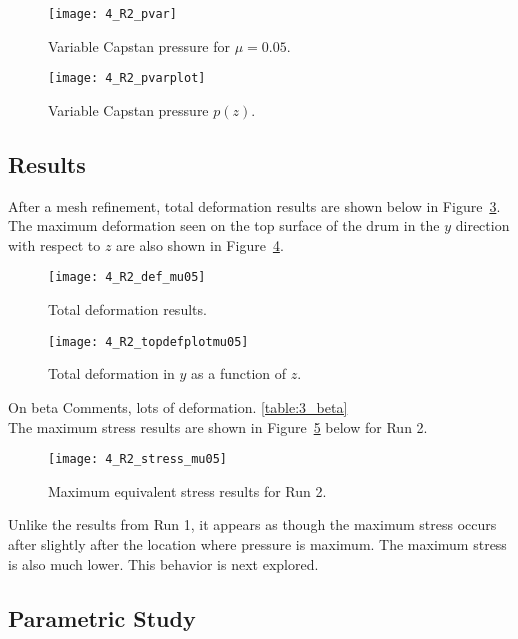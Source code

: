 \begin{figure}[H]
	\centering
	\texttt{[image: 4\_R2\_pvar]}
	\caption{Variable Capstan pressure for $\mu=0.05$.}
	\label{fig:4_R2_pvar}
\end{figure}
\begin{figure}[H]
	\centering
	\texttt{[image: 4\_R2\_pvarplot]}
	\caption{Variable Capstan pressure $p(z)$.}
	\label{fig:4_R2_pvarplot}
\end{figure}

\subsection{Results}

After a mesh refinement, total deformation results are shown below in Figure~\ref{fig:4_R2_def_mu05}. The maximum deformation seen on the top surface of the drum in the $y$ direction with respect to $z$ are also shown in Figure~\ref{fig:4_R2_topdefplotmu05}.

\begin{figure}[H]
	\centering
 	\texttt{[image: 4\_R2\_def\_mu05]}
 	\caption{Total deformation results.}
 	\label{fig:4_R2_def_mu05}
 \end{figure}
 
 \begin{figure}[H]
 	\centering
 \texttt{[image: 4\_R2\_topdefplotmu05]}
 	\caption{Total deformation in $y$ as a function of $z$.}
 	\label{fig:4_R2_topdefplotmu05}
 \end{figure}
 
 On beta Comments, lots of deformation. \ref{table:3_beta}\\

The maximum stress results are shown in Figure~\ref{fig:4_R2_stress_mu05} below for Run 2.

\begin{figure}[H]
	\centering
	\texttt{[image: 4\_R2\_stress\_mu05]}
	\caption{Maximum equivalent stress results for Run 2.}
	\label{fig:4_R2_stress_mu05}
\end{figure}

Unlike the results from Run 1, it appears as though the maximum stress occurs after slightly after the location where pressure is maximum. The maximum stress is also much lower. This behavior is next explored.

\subsection{Parametric Study}


